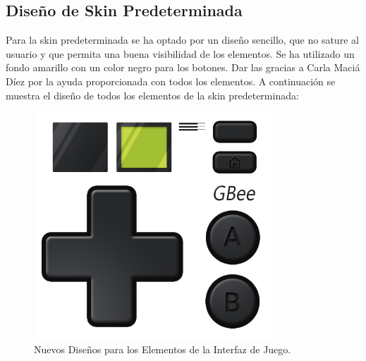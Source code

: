 \subsection{Diseño de Skin Predeterminada}
Para la skin predeterminada se ha optado por un diseño sencillo, que no sature al usuario y que permita una buena visibilidad de los elementos. Se ha utilizado un fondo amarillo con un color negro para los botones. Dar las gracias a Carla Maciá Díez por la ayuda proporcionada con todos los elementos. A continuación se muestra el diseño de todos los elementos de la skin predeterminada:

\begin{figure}[H]
    \centering
    \includegraphics[width=0.8\textwidth]{include/images/new_design_elements.png}
    \caption{Nuevos Diseños para los Elementos de la Interfaz de Juego.}\label{figure:newDesignElements}
\end{figure}

\cleardoublepage